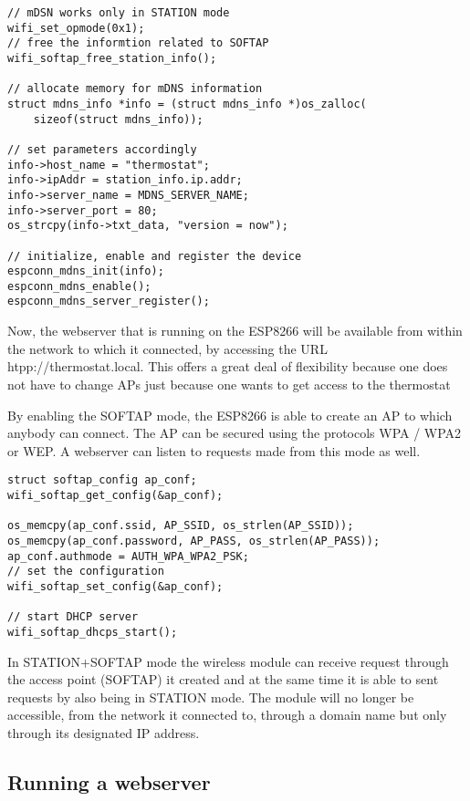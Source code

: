 \begin{lstlisting}[frame=single]
// mDSN works only in STATION mode
wifi_set_opmode(0x1);
// free the informtion related to SOFTAP
wifi_softap_free_station_info();

// allocate memory for mDNS information
struct mdns_info *info = (struct mdns_info *)os_zalloc(
    sizeof(struct mdns_info));

// set parameters accordingly
info->host_name = "thermostat";
info->ipAddr = station_info.ip.addr;
info->server_name = MDNS_SERVER_NAME;
info->server_port = 80;
os_strcpy(info->txt_data, "version = now");

// initialize, enable and register the device
espconn_mdns_init(info);
espconn_mdns_enable();
espconn_mdns_server_register();
\end{lstlisting}
Now, the webserver that is running on the ESP8266 will be available from within the network to which it
connected, by accessing the URL htpp://thermostat.local. This offers a great deal of flexibility because one
does not have to change APs just because one wants to get access to the thermostat

By enabling the SOFTAP mode, the ESP8266 is able to create an AP to which anybody can connect. The AP can be
secured using the protocols WPA / WPA2 or WEP. A webserver can listen to requests made from this mode as well.

\begin{lstlisting}[frame=single]
struct softap_config ap_conf;
wifi_softap_get_config(&ap_conf);

os_memcpy(ap_conf.ssid, AP_SSID, os_strlen(AP_SSID));
os_memcpy(ap_conf.password, AP_PASS, os_strlen(AP_PASS));
ap_conf.authmode = AUTH_WPA_WPA2_PSK;
// set the configuration
wifi_softap_set_config(&ap_conf);

// start DHCP server
wifi_softap_dhcps_start();
\end{lstlisting}

In STATION+SOFTAP mode the wireless module can receive request through the access point (SOFTAP) it created
and at the same time it is able to sent requests by also being in STATION mode. The module will no longer be
accessible, from the network it connected to, through a domain name but only through its designated IP
address.

\subsection{Running a webserver}

